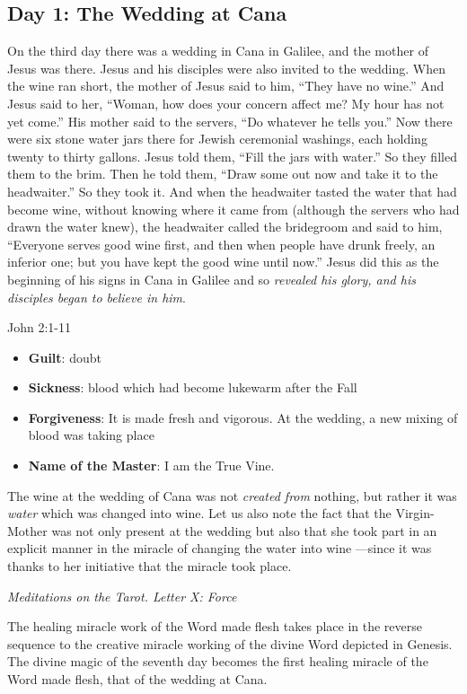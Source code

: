 \subsection*{Day 1: The Wedding at Cana}
On the third day there was a wedding in Cana in Galilee, and the mother of Jesus was there. Jesus and his disciples were
also invited to the wedding. When the wine ran short, the mother of Jesus said to him, “They have no wine.” And Jesus
said to her, “Woman, how does your concern affect me? My hour has not yet come.” His mother said to the servers, “Do
whatever he tells you.” Now there were six stone water jars there for Jewish ceremonial washings, each holding twenty
to thirty gallons. Jesus told them, “Fill the jars with water.” So they filled them to the brim. Then he told them,
“Draw some out now and take it to the headwaiter.” So they took it. And when the headwaiter tasted the water that had
become wine, without knowing where it came from (although the servers who had drawn the water knew), the headwaiter
called the bridegroom and said to him, “Everyone serves good wine first, and then when people have drunk freely, an
inferior one; but you have kept the good wine until now.” Jesus did this as the beginning of his signs in Cana in
Galilee and so \emph{revealed his glory, and his disciples began to believe in him}. \begin{flushright} John 2:1-11\end{flushright}

\begin{itemize}
\item \textbf{Guilt}: doubt 
\item \textbf{Sickness}: blood which had become lukewarm after the Fall 
\item \textbf{Forgiveness}: It is made fresh and vigorous. At the wedding, a new mixing of blood was taking place 
\item \textbf{Name of the Master}: I am the True Vine. 
\end{itemize}
\begin{quotationx}
The wine at the wedding of Cana was not \emph{created from} nothing, but rather it was \emph{water} which was changed
into wine. Let us also note the fact that the Virgin-Mother was not only present at the wedding but also that she took
part in an explicit manner in the miracle of changing the water into wine —since it was thanks to
her initiative that the miracle took place. \begin{flushright} \emph{Meditations on the Tarot. Letter X: Force}\end{flushright}

\end{quotationx}
The healing miracle work of the Word made flesh takes place in the reverse sequence to the creative miracle working of
the divine Word depicted in Genesis. The divine magic of the seventh day becomes the first healing miracle of the Word
made flesh, that of the wedding at Cana.

